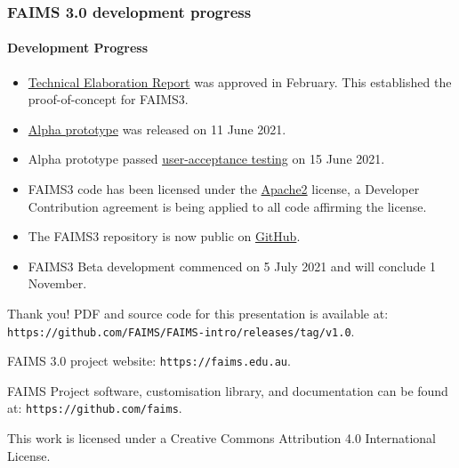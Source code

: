 \documentclass[
	aspectratio=169, %
	12pt, %
	t, %
]{beamer}
\begin{document}
\begin{refsegment}
\begin{frame}
    \frametitle{FAIMS 3.0 development progress}
    \framesubtitle{Development Progress}        
        \begin{itemize}
            \item \href{https://docs.google.com/document/d/13eTN8jhJa3Pgs9GOdo7r4jtIQcskNo7ikxJcBDBKHzw/edit}{Technical Elaboration Report} was approved in February. This established the proof-of-concept for FAIMS3. 
          \item \href{https://github.com/FAIMS/FAIMS3/releases/tag/v0.1.0-alpha}{Alpha prototype} was released on 11 June 2021.  
          \item Alpha prototype passed \href{https://doi.org/10.5281/zenodo.5030772}{user-acceptance testing} on 15 June 2021.
        \item FAIMS3 code has been licensed under the \href{https://www.apache.org/licenses/LICENSE-2.0}{Apache2} license, a Developer Contribution agreement is being applied to all code affirming the license. 
        \item The FAIMS3 repository is now public on \href{https://github.com/FAIMS/FAIMS3}{GitHub}.
        \item FAIMS3 Beta development commenced on 5 July 2021 and will conclude 1 November. 

    \end{itemize}



\end{frame} 


\begin{frame}{Thank you!}
PDF and source code for this presentation is available at: 
\texttt{https://github.com/FAIMS/FAIMS-intro/releases/tag/v1.0}.

FAIMS 3.0 project website: \texttt{https://faims.edu.au}.

FAIMS Project software, customisation library, and documentation can be found at:
\texttt{https://github.com/faims}.


This work is licensed under a Creative Commons Attribution 4.0 International License.

\end{frame}



\end{refsegment}
\end{document}
